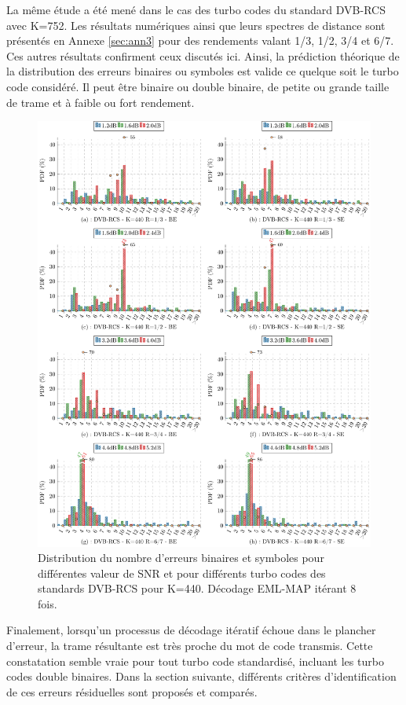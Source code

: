 La même étude a été mené dans le cas des turbo codes du standard DVB-RCS avec K=752. Les résultats numériques ainsi
que leurs spectres de distance sont présentés en Annexe \ref{sec:ann3} pour des rendements valant 1/3, 1/2, 3/4 et 6/7. 
Ces autres résultats confirment ceux discutés ici. Ainsi, la prédiction théorique de la distribution des erreurs binaires 
ou symboles est valide ce quelque soit le turbo code considéré. Il peut être binaire ou double binaire, de petite ou grande
taille de trame et à faible ou fort rendement.
\begin{figure}[!ht] 
	\centering
	\hspace*{-1cm}
	\includegraphics[width=1.05\textwidth]{main/ch3_fig/be/dvb/tikz/be_440.pdf}
	\caption{Distribution du nombre d'erreurs binaires et symboles pour différentes valeur de SNR et pour différents turbo codes des 
	standards DVB-RCS pour K=440.	Décodage EML-MAP itérant 8 fois. \label{fig:be_dvb440}}
\end{figure}

Finalement, lorsqu'un processus de décodage itératif échoue dans le plancher d'erreur, la trame résultante est très proche du 
mot de code transmis. Cette constatation semble vraie pour tout turbo code standardisé, incluant les turbo codes
double binaires. Dans la section suivante, différents critères d'identification de ces erreurs résiduelles sont 
proposés et comparés.
\newpage
